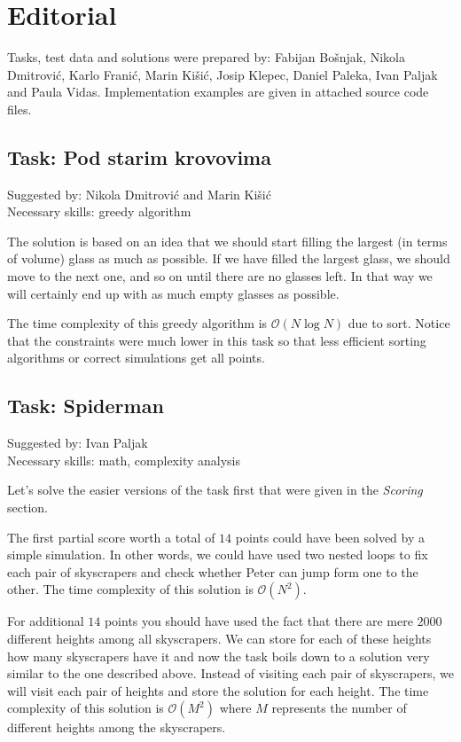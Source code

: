 \documentclass[a4paper]{article}
\begin{document}
\section*{Editorial}

Tasks, test data and solutions were prepared by: Fabijan Bošnjak, Nikola
Dmitrović, Karlo Franić, Marin Kišić, Josip Klepec, Daniel Paleka, Ivan Paljak
and Paula Vidas. Implementation examples are given in attached source code
files.

\subsection*{Task: Pod starim krovovima}
\textsf{Suggested by: Nikola Dmitrović and Marin Kišić}\\
\textsf{Necessary skills: greedy algorithm}

The solution is based on an idea that we should start filling the largest (in
terms of volume) glass as much as possible. If we have filled the largest
glass, we should move to the next one, and so on until there are no glasses
left. In that way we will certainly end up with as much empty glasses as
possible.

The time complexity of this greedy algorithm is $\mathcal{O}(N \log N)$ due
to sort. Notice that the constraints were much lower in this task so that
less efficient sorting algorithms or correct simulations get all points.

\subsection*{Task: Spiderman}
\textsf{Suggested by: Ivan Paljak}\\
\textsf{Necessary skills: math, complexity analysis}

Let's solve the easier versions of the task first that were given in the
\textit{Scoring} section.

The first partial score worth a total of $14$ points could have been solved by
a simple simulation. In other words, we could have used two nested loops to fix
each pair of skyscrapers and check whether Peter can jump form one to the other.
The time complexity of this solution is $\mathcal{O}(N^2)$.

For additional $14$ points you should have used the fact that there are mere
$2000$ different heights among all skyscrapers. We can store for each of these
heights how many skyscrapers have it and now the task boils down to a solution
very similar to the one described above. Instead of visiting each pair of
skyscrapers, we will visit each pair of heights and store the solution for each
height. The time complexity of this solution is $\mathcal{O}(M^2)$ where $M$
represents the number of different heights among the skyscrapers.
\end{document}
